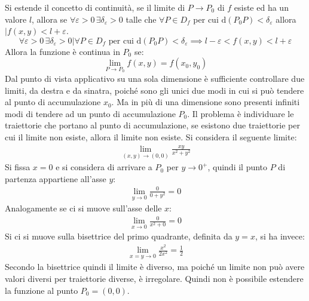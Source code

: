 \documentclass{article}
\newcommand{\df}{\mathrm{d}}
\numberwithin{equation}{subsection}
\begin{document}
Si estende il concetto di continuità, se il limite di $P\to P_0$ di $f$ esiste ed ha un valore $l$, allora se $\forall\varepsilon>0\,\exists\delta_\varepsilon>0$ talle che $\forall P\in D_f$ per cui $\df(P_0P)<\delta_\varepsilon$ allora $|f(x,y)<l+\varepsilon$. 
\begin{equation}
    \forall\varepsilon>0\,\exists\delta_\varepsilon>0\big|\forall P\in D_f\mbox{ per cui }\df(P_0P)<\delta_\varepsilon\implies l-\varepsilon<f(x,y)<l+\varepsilon
\end{equation}
Allora la funzione è continua in $P_0$ se:
\begin{equation}
    \lim_{P\to P_0}f(x,y)=f(x_0,y_0)
\end{equation}
Dal punto di vista applicativo su una sola dimensione è sufficiente controllare due limiti, da destra e da sinatra, poiché sono gli unici due modi in cui si può tendere al punto di accumulazione $x_0$. Ma in più di una dimensione sono presenti infiniti modi di tendere ad un punto di accumulazione $P_0$. 
Il problema è individuare le traiettorie che portano al punto di accumulazione, se esistono due traiettorie per cui il limite non esiste, allora il limite non esiste. 
Si considera il seguente limite:
\begin{gather*}
    \lim_{(x,y)\to(0,0)}\displaystyle\frac{xy}{x^2+y^2}
\end{gather*}
Si fissa $x=0$ e si considera di arrivare a $P_0$ per $y\to 0^+$, quindi il punto $P$ di partenza appartiene all'asse $y$:
\begin{gather*}
    \lim_{y\to0}\displaystyle\frac{0}{0+y^2}=0
\end{gather*}
Analogamente se ci si muove sull'asse delle $x$:
\begin{gather*}
    \lim_{x\to0}\displaystyle\frac{0}{x^2+0}=0
\end{gather*}
Si ci si muove sulla bisettrice del primo quadrante, definita da $y=x$, si ha invece:
\begin{gather*}
    \lim_{x=y\to0}\displaystyle\frac{x^2}{2x^2}=\frac{1}{2}
\end{gather*}
Secondo la bisettrice quindi il limite è diverso, ma poiché un limite non può avere valori diversi per traiettorie diverse, è irregolare. Quindi non è possibile estendere la funzione al punto $P_0=(0,0)$. 
\end{document}
